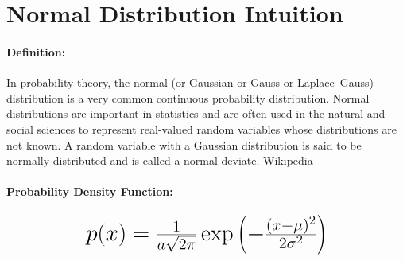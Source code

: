 \documentclass[12pt]{article}
\newcommand{\negBi}[3][2]{(#2- #3)^{#1}}
\newcommand*{\mH}[1]{\mbox{\huge$#1$}}
\begin{document}
\section*{Normal Distribution Intuition}
\paragraph{Definition:}%

In probability theory, the normal (or Gaussian or Gauss or Laplace–Gauss) distribution is a very common continuous probability distribution. Normal distributions are important in statistics and are often used in the natural and social sciences to represent real-valued random variables whose distributions are not known. A random variable with a Gaussian distribution is said to be normally distributed and is called a normal deviate. \href{https://en.wikipedia.org/wiki/Normal_distribution}{Wikipedia}

\paragraph{Probability Density Function:}
\begin{equation}
	\mH{%
		p(x) = \frac{1}{a\sqrt{2\pi}}\exp
		\left(-\frac{\negBi{x}{\mu}}{2\sigma^2}\right)
	}
\end{equation}

\end{document}
